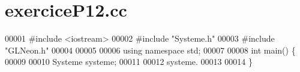 \section{exercice\+P12.\+cc}
\label{exercice_p12_8cc_source}

\begin{DoxyCode}
00001 \textcolor{preprocessor}{#include <iostream>}
00002 \textcolor{preprocessor}{#include "Systeme.h"}
00003 \textcolor{preprocessor}{#include "GLNeon.h"}
00004 
00005 
00006 \textcolor{keyword}{using namespace }std;
00007 
00008 \textcolor{keywordtype}{int} main() \{
00009     
00010     Systeme systeme;
00011     
00012     systeme.
00013     
00014 \}
\end{DoxyCode}
